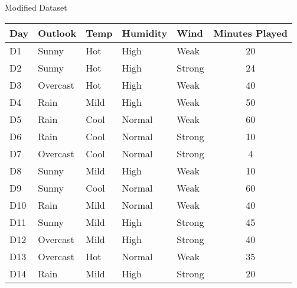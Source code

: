 \documentclass[usenames,dvipsnames]{beamer}
\begin{document}
\begin{frame}{Modified Dataset}
\begin{table}[]
	\begin{tabular}{@{}lllllc@{}}
		\toprule
		\textbf{Day} & \textbf{Outlook} & \textbf{Temp} & \textbf{Humidity} & \textbf{Wind} & \textbf{Minutes Played} \\ \midrule
		D1           & Sunny            & Hot           & High              & Weak          & 20                      \\
		D2           & Sunny            & Hot           & High              & Strong        & 24                      \\
		D3           & Overcast         & Hot           & High              & Weak          & 40                      \\
		D4           & Rain             & Mild          & High              & Weak          & 50                      \\
		D5           & Rain             & Cool          & Normal            & Weak          & 60                      \\
		D6           & Rain             & Cool          & Normal            & Strong        & 10                      \\
		D7           & Overcast         & Cool          & Normal            & Strong        & 4                       \\
		D8           & Sunny            & Mild          & High              & Weak          & 10                      \\
		D9           & Sunny            & Cool          & Normal            & Weak          & 60                      \\
		D10          & Rain             & Mild          & Normal            & Weak          & 40                      \\
		D11          & Sunny            & Mild          & High              & Strong        & 45                      \\
		D12          & Overcast         & Mild          & High              & Strong        & 40                      \\
		D13          & Overcast         & Hot           & Normal            & Weak          & 35                      \\
		D14          & Rain             & Mild          & High              & Strong        & 20                      \\ \bottomrule
	\end{tabular}
\end{table}
\end{frame}
\end{document}

